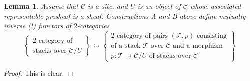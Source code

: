 \documentclass{stacks-project}
\theoremstyle{plain}
\newtheorem{lemma}[subsection]{Lemma}
\theoremstyle{definition}
\theoremstyle{remark}
\numberwithin{equation}{subsection}
\begin{document}
\begin{lemma}
\label{lemma-localize-stacks}
Assume that $\mathcal{C}$ is a site,
and $U$ is an object of $\mathcal{C}$ whose associated representable
presheaf is a sheaf. Constructions A and B above define
mutually inverse (!) functors of $2$-categories
$$
\left\{
\begin{matrix}
2\text{-category of}\\
\text{stacks over }\mathcal{C}/U
\end{matrix}
\right\}
\leftrightarrow
\left\{
\begin{matrix}
2\text{-category of pairs }(\mathcal{T}, p)
\text{ consisting} \\
\text{of a stack }\mathcal{T}\text{ over }\mathcal{C}\text{ and a morphism} \\
p : \mathcal{T} \to \mathcal{C}/U\text{ of stacks over }\mathcal{C}
\end{matrix}
\right\}
$$
\end{lemma}

\begin{proof}
This is clear.
\end{proof}








\end{document}
